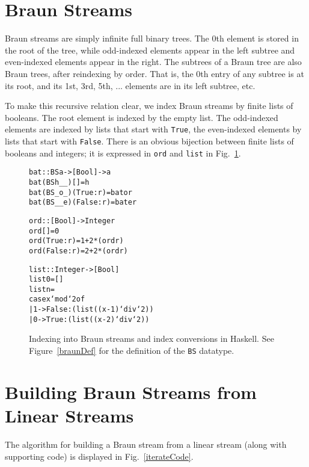 \documentclass[envcountsect]{llncs}
\begin{document}
\section{Braun Streams}

Braun streams are simply infinite full binary trees.
The $0$th element is stored in the root of the tree, while odd-indexed elements appear in the left subtree and even-indexed elements appear in the right.
The subtrees of a Braun tree are also Braun trees, after reindexing by order.
That is, the 0th entry of any subtree is at its root, and its 1st, 3rd, 5th, ... elements are in its left subtree, etc.

To make this recursive relation clear, we index Braun streams by finite lists of booleans.
The root element is indexed by the empty list.
The odd-indexed elements are indexed by lists that start with \verb|True|, the even-indexed elements by lists that start with \verb|False|.
There is an obvious bijection between finite lists of booleans and integers;
it is expressed in \verb|ord| and \verb|list| in Fig.~\ref{basicCode}.

\begin{figure}
\begin{alltt}
bat :: BS a -> [Bool] -> a
bat (BS h _ _) [] = h
bat (BS _ o _) (True:r) = bat o r
bat (BS _ _ e) (False:r) = bat e r

ord :: [Bool] -> Integer
ord [] = 0
ord (True:r) = 1 + 2*(ord r)
ord (False:r) = 2 + 2*(ord r)

list :: Integer -> [Bool]
list 0 = []
list n = 
    case x `mod` 2 of
      | 1 -> False:(list ((x-1)`div`2))
      | 0 -> True:(list ((x-2)`div`2))
\end{alltt}
\caption{Indexing into Braun streams and index conversions in Haskell.
See Figure~\ref{braunDef} for the definition of the {\tt BS} datatype.}
\label{basicCode}
\end{figure}

\section{Building Braun Streams from Linear Streams}
\label{iterSect}

The algorithm for building a Braun stream from a linear stream (along with supporting code) is displayed in Fig.~\ref{iterateCode}.
\end{document}
